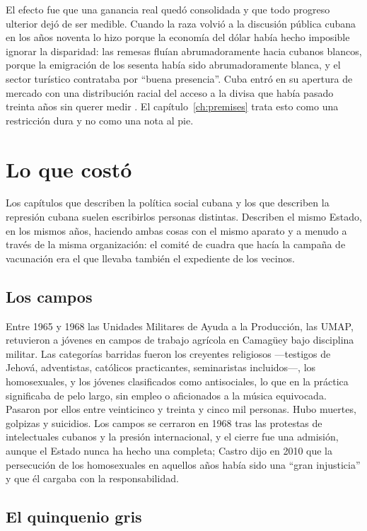 El efecto fue que una ganancia real quedó consolidada y que todo progreso
ulterior dejó de ser medible. Cuando la raza volvió a la discusión pública cubana
en los años noventa lo hizo porque la economía del dólar había hecho imposible
ignorar la disparidad: las remesas fluían abrumadoramente hacia cubanos blancos,
porque la emigración de los sesenta había sido abrumadoramente blanca, y el
sector turístico contrataba por ``buena presencia''. Cuba entró en su apertura de
mercado con una distribución racial del acceso a la divisa que había pasado
treinta años sin querer medir \citep{delafuente2001}. El
capítulo~\ref{ch:premises} trata esto como una restricción dura y no como una
nota al pie.

\section{Lo que costó}

Los capítulos que describen la política social cubana y los que describen la
represión cubana suelen escribirlos personas distintas. Describen el mismo
Estado, en los mismos años, haciendo ambas cosas con el mismo aparato y a menudo
a través de la misma organización: el comité de cuadra que hacía la campaña de
vacunación era el que llevaba también el expediente de los vecinos.

\subsection{Los campos}

Entre 1965 y 1968 las Unidades Militares de Ayuda a la Producción, las UMAP,
retuvieron a jóvenes en campos de trabajo agrícola en Camagüey bajo disciplina
militar. Las categorías barridas fueron los creyentes religiosos ---testigos de
Jehová, adventistas, católicos practicantes, seminaristas incluidos---, los
homosexuales, y los jóvenes clasificados como antisociales, lo que en la práctica
significaba de pelo largo, sin empleo o aficionados a la música equivocada.
Pasaron por ellos entre veinticinco y treinta y cinco mil personas.\unv{} Hubo
muertes, golpizas y suicidios. Los campos se cerraron en 1968 tras las protestas
de intelectuales cubanos y la presión internacional, y el cierre fue una
admisión, aunque el Estado nunca ha hecho una completa; Castro dijo en 2010 que
la persecución de los homosexuales en aquellos años había sido una ``gran
injusticia'' y que él cargaba con la responsabilidad.

\subsection{El quinquenio gris}

